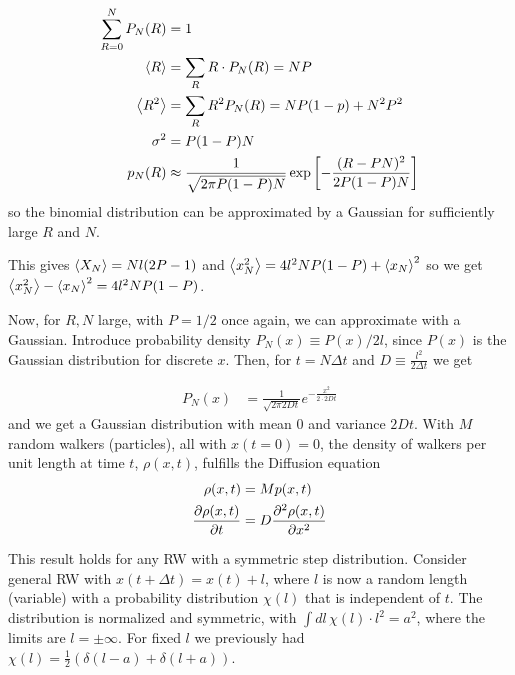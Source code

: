 \documentclass[a4paper, english, 12pt]{article}
\newcommand{\bracket}[1]{\left[ #1 \right]}
\begin{document}
\begin{multicols*}{2}
\begin{align*}
    \sum_{R=0}^N P_N(R) &= 1 \\ 
    \expval{R} &= \sum_R R\cdot P_N(R)=NP \\ 
    \expval{R^2} &= \sum_R R^2 P_N(R) = NP(1-p) + N^2 P^2 \\
    \sigma^2 &= P(1-P)N \\ 
    p_N(R) &\approx \frac{1}{\sqrt{2\pi P(1-P)N}}\exp\bracket{-\frac{(R-PN)^2}{2P(1-P)N}}
\end{align*}
so the binomial distribution can be approximated by a Gaussian for sufficiently large $R$ and $N$. 

This gives $\expval{X_N}=Nl(2P-1)$ and $\expval{x_N^2}=4l^2 NP(1-P) + \expval{x_N}^2$ so we get $\expval{x_N^2} - \expval{x_N}^2 = 4l^2 N P(1-P)$.

Now, for $R,N$ large, with $P=1/2$ once again, we can approximate with a Gaussian. Introduce probability density $P_N(x)\equiv P(x)/2l$, since $P(x)$ is the Gaussian distribution for discrete $x$. Then, for $t=N\Delta t$ and $D\equiv \frac{l^2}{2\Delta t}$ we get 

\begin{align*}
    P_N(x) &= \frac{1}{\sqrt{2\pi 2Dt}} e^{-\frac{x^2}{2\cdot 2Dt}}
\end{align*}
and we get a Gaussian distribution with mean $0$ and variance $2Dt$. With $M$ random walkers (particles), all with $x(t=0)=0$, the density of walkers per unit length at time $t$, $\rho(x,t)$, fulfills the Diffusion equation 
\begin{align*}
    \rho(x,t) &= M p(x,t) \\ 
    \pdv{\rho(x,t)}{t} &= D \pdv[2]{\rho(x,t)}{x}
\end{align*}


This result holds for any RW with a symmetric step distribution. Consider general RW with $x(t+\Delta t)=x(t)+l$, where $l$ is now a random length (variable) with a probability distribution $\chi(l)$ that is independent of $t$. The distribution is normalized and symmetric, with $\int dl\,\chi(l)\cdot l^2=a^2$, where the limits are $l=\pm\infty$. For fixed $l$ we previously had $\chi(l)=\frac{1}{2}(\delta(l-a) + \delta(l+a))$. 


\end{multicols*}
\end{document}
